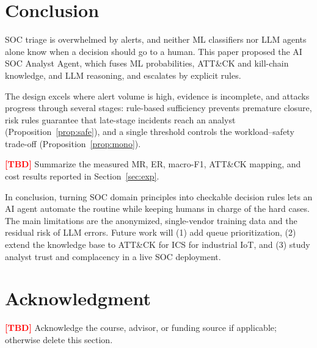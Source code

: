 \documentclass[conference]{IEEEtran}
\newcommand{\TBD}{\textcolor{red}{\textbf{[TBD]}}}
\begin{document}
\section{Conclusion}\label{sec:concl}

SOC triage is overwhelmed by alerts, and neither ML classifiers nor
LLM agents alone know when a decision should go to a human. This paper
proposed the AI SOC Analyst Agent, which fuses ML probabilities,
ATT\&CK and kill-chain knowledge, and LLM reasoning, and escalates by
explicit rules.

The design excels where alert volume is high, evidence is incomplete,
and attacks progress through several stages: rule-based sufficiency
prevents premature closure, risk rules guarantee that late-stage
incidents reach an analyst (Proposition~\ref{prop:safe}), and a single
threshold controls the workload--safety trade-off
(Proposition~\ref{prop:mono}).

\TBD{} Summarize the measured MR, ER, macro-F1, ATT\&CK mapping, and
cost results reported in Section~\ref{sec:exp}.

In conclusion, turning SOC domain principles into checkable decision
rules lets an AI agent automate the routine while keeping humans in
charge of the hard cases. The main limitations are the anonymized,
single-vendor training data and the residual risk of LLM errors. Future
work will (1) add queue prioritization, (2) extend the knowledge base
to ATT\&CK for ICS for industrial IoT, and (3) study analyst trust and
complacency in a live SOC deployment.

\section*{Acknowledgment}
\TBD{} Acknowledge the course, advisor, or funding source if
applicable; otherwise delete this section.
\end{document}
